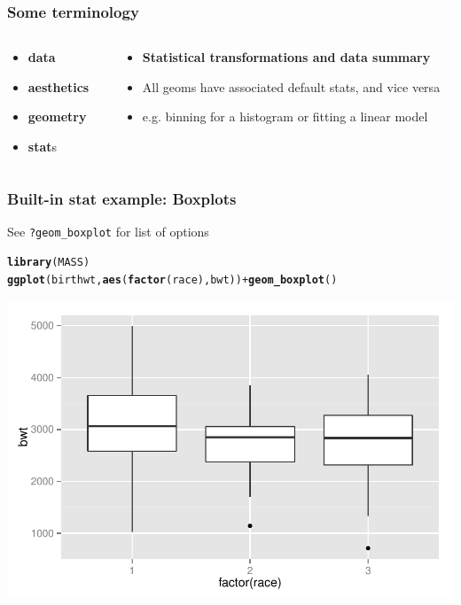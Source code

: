 \documentclass{beamer}\usepackage[]{graphicx}\usepackage[]{color}
\makeatletter
\newcommand{\hlopt}[1]{\textcolor[rgb]{0,0,0}{#1}}%
\newcommand{\hlstd}[1]{\textcolor[rgb]{0.345,0.345,0.345}{#1}}%
\newcommand{\hlkwd}[1]{\textcolor[rgb]{0.737,0.353,0.396}{\textbf{#1}}}%
\newenvironment{kframe}{%
 \def\at@end@of@kframe{}%
 \ifinner\ifhmode%
  \def\at@end@of@kframe{\end{minipage}}%
  \begin{minipage}{\columnwidth}%
 \fi\fi%
 \def\FrameCommand##1{\hskip\@totalleftmargin \hskip-\fboxsep
 \colorbox{shadecolor}{##1}\hskip-\fboxsep
     \hskip-\linewidth \hskip-\@totalleftmargin \hskip\columnwidth}%
 \MakeFramed {\advance\hsize-\width
   \@totalleftmargin\z@ \linewidth\hsize
   \@setminipage}}%
 {\par\unskip\endMakeFramed%
 \at@end@of@kframe}
\newenvironment{knitrout}{}{} %
\makeatother
\begin{document}
\begin{frame}[fragile]
\frametitle{Some terminology}
\begin{columns}[t]

\begin{column}[T]{3cm}
\begin{itemize}
    \item \textbf{\color{gray}data}
    \item \textbf{\color{gray}aesthetics}
    \item \textbf{\color{gray}geometry}
    \item \textbf{stat}s
\end{itemize}
\end{column}

\begin{column}[T]{8cm}
\begin{itemize}
    \item \textbf{Statistical transformations and data summary}
    \item All geoms have associated default stats, and vice versa
    \item e.g. binning for a histogram or fitting a linear model
\end{itemize}
\end{column}

\end{columns}
\end{frame}


\begin{frame}[fragile]
\frametitle{Built-in stat example: Boxplots}
See \texttt{?geom\_boxplot} for list of options
\begin{knitrout}\footnotesize
{}\color{fgcolor}\begin{kframe}
\begin{alltt}
\hlkwd{library}\hlstd{(MASS)}
\hlkwd{ggplot}\hlstd{(birthwt,} \hlkwd{aes}\hlstd{(}\hlkwd{factor}\hlstd{(race), bwt))} \hlopt{+} \hlkwd{geom_boxplot}\hlstd{()}
\end{alltt}
\end{kframe}

{\centering \includegraphics[width=.75\linewidth]{figure/boxplots1_} 

}



\end{knitrout}

\end{frame}
\end{document}
